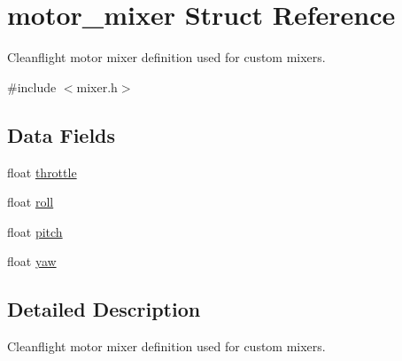 \hypertarget{structmotor__mixer}{\section{motor\+\_\+mixer Struct Reference}
\label{structmotor__mixer}
}


Cleanflight motor mixer definition used for custom mixers.  




{\ttfamily \#include $<$mixer.\+h$>$}

\subsection*{Data Fields}
\begin{DoxyCompactItemize}
\item 
float \hyperlink{structmotor__mixer_a2166ebcf3651014bb63900bbb59dc8a7}{throttle}
\item 
float \hyperlink{structmotor__mixer_af0283249c0c19f18b09a46e8d297780d}{roll}
\item 
float \hyperlink{structmotor__mixer_abd6d66073c034ccd0f33da1dc32cb224}{pitch}
\item 
float \hyperlink{structmotor__mixer_a2c994c946d402c2146580706d5556d3b}{yaw}
\end{DoxyCompactItemize}


\subsection{Detailed Description}
Cleanflight motor mixer definition used for custom mixers. 

